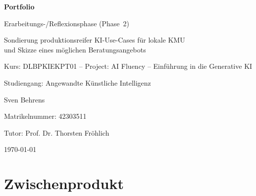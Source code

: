 \documentclass[a4paper,11pt]{article}
\begin{document}
\begin{titlepage}
    \thispagestyle{empty}
    \centering
    \vspace*{5cm}
    {\Huge\bfseries Portfolio \par}
    \vspace{0.3cm}
    {\Large Erarbeitungs-/Reflexionsphase (Phase~2) \par}
    \vspace{1cm}
    {\large Sondierung produktionsreifer KI-Use-Cases für lokale KMU \\ und Skizze eines möglichen Beratungsangebots \par}
    \vspace{1.5cm}
    {\large Kurs: DLBPKIEKPT01 -- Project: AI Fluency -- Einführung in die Generative KI \par}
    \vspace{0.5cm}
    {\large Studiengang: Angewandte Künstliche Intelligenz \par}
    \vspace{0.5cm}
    {\large Sven Behrens \par}
    \vspace{0.5cm}
    {\large Matrikelnummer: 42303511 \par}
    \vspace{0.5cm}
    {\large Tutor: Prof. Dr. Thorsten Fröhlich \par}
    \vspace{0.5cm}
    {\large \today \par}
\end{titlepage}

\setcounter{page}{1}

\tableofcontents
\newpage

\setcounter{page}{1}


\section{Zwischenprodukt}
\end{document}
